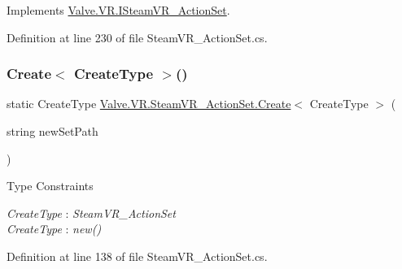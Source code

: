 Implements \mbox{\hyperlink{interface_valve_1_1_v_r_1_1_i_steam_v_r___action_set_ad7a3807ce56c1ace0e0dba9c666380c4}{Valve.\+V\+R.\+I\+Steam\+V\+R\+\_\+\+Action\+Set}}.



Definition at line 230 of file Steam\+V\+R\+\_\+\+Action\+Set.\+cs.

\mbox{\label{class_valve_1_1_v_r_1_1_steam_v_r___action_set_a2e7f4010655d5bab8525920914d564aa}} 
\subsubsection{\texorpdfstring{Create$<$ CreateType $>$()}{Create< CreateType >()}}
{\footnotesize\ttfamily static Create\+Type \mbox{\hyperlink{namespace_valve_1_1_v_r_a59487dd6eb3684570995a3bea405db2ea686e697538050e4664636337cc3b834f}{Valve.\+V\+R.\+Steam\+V\+R\+\_\+\+Action\+Set.\+Create}}$<$ Create\+Type $>$ (\begin{DoxyParamCaption}\item[{string}]{new\+Set\+Path }\end{DoxyParamCaption})\hspace{0.3cm}{\ttfamily [static]}}

\begin{Desc}
\item[Type Constraints]\begin{description}
\item[{\em Create\+Type} : {\em Steam\+V\+R\+\_\+\+Action\+Set}]\item[{\em Create\+Type} : {\em new()}]\end{description}
\end{Desc}


Definition at line 138 of file Steam\+V\+R\+\_\+\+Action\+Set.\+cs.

\mbox{\label{class_valve_1_1_v_r_1_1_steam_v_r___action_set_acdc177c7f04c22b27113570985449870}} 
